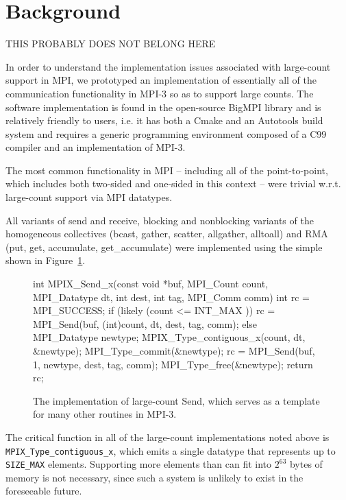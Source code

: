 
\section{Background}

THIS PROBABLY DOES NOT BELONG HERE

In order to understand the implementation issues associated with
large-count support in MPI, we prototyped an implementation of
essentially all of the communication functionality in MPI-3 so as to 
support large counts.  
The software implementation is found in the open-source BigMPI
library and is relatively friendly to users, i.e. it has both a Cmake
and an Autotools build system and requires a generic programming
environment composed of a C99 compiler and an implementation
of MPI-3.

The most common functionality in MPI -- including all of the point-to-point,
which includes both two-sided and one-sided in this context -- were
trivial w.r.t. large-count support via MPI datatypes.

All variants of send and receive, blocking and nonblocking variants of
the homogeneous collectives (bcast, gather, scatter, allgather, alltoall)
and RMA (put, get, accumulate, get\_accumulate) were implemented
using the simple shown in Figure~\ref{code:mpi_send_x}.

\begin{figure}
\begin{code}
int MPIX_Send_x(const void *buf, MPI_Count count,
                MPI_Datatype dt, int dest,
                int tag, MPI_Comm comm)
{
    int rc = MPI_SUCCESS;
    if (likely (count <= INT_MAX )) {
        rc = MPI_Send(buf, (int)count, dt, dest, tag, comm);
    } else {
        MPI_Datatype newtype;
        MPIX_Type_contiguous_x(count, dt, &newtype);
        MPI_Type_commit(&newtype);
        rc = MPI_Send(buf, 1, newtype, dest, tag, comm);
        MPI_Type_free(&newtype);
    }
    return rc;
}
\end{code}
\label{code:mpi_send_x}
\caption{The implementation of large-count Send, which serves as a template
for many other routines in MPI-3.}
\end{figure}

The critical function in all of the large-count implementations noted above
is \texttt{MPIX\_Type\_contiguous\_x}, which emits a single datatype that
represents up to \texttt{SIZE\_MAX} elements.
Supporting more elements than can fit into $2^{63}$ bytes of memory is
not necessary, since such a system is unlikely to exist in the foreseeable future.




